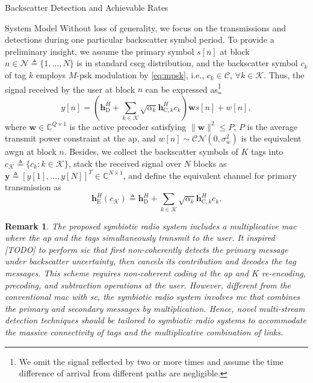 \documentclass[journal]{IEEEtran}
\newtheorem{remark}{Remark}
\begin{document}
\begin{section}{Backscatter Detection and Achievable Rates}
\begin{subsection}{System Model}
			Without loss of generality, we focus on the transmissions and detections during one particular backscatter symbol period. To provide a preliminary insight, we assume the primary symbol $s[n]$ at block $n \in \mathcal{N} \triangleq \{1,\ldots,N\}$ is in standard \gls{cscg} distribution, and the backscatter symbol $c_k$ of tag $k$ employs $M$-\gls{psk} modulation by \eqref{eq:mpsk}, i.e., $c_k \in \mathcal{C}$, $\forall k \in \mathcal{K}$. Thus, the signal received by the user at block $n$ can be expressed as\footnote{We omit the signal reflected by two or more times\cite{Wu2019} and assume the time difference of arrival from different paths are negligible\cite{Guo2019b}.}
			\begin{equation}
				y[n] = \left(\boldsymbol{h}_{\mathrm{D}}^H + \sum_{k \in \mathcal{K}} \sqrt{\alpha_k} \boldsymbol{h}_{\mathrm{C},k}^H c_k\right) \boldsymbol{w} s[n] + w[n],
				\label{eq:received_signal}
			\end{equation}
			where $\boldsymbol{w} \in \mathbb{C}^{Q \times 1}$ is the active precoder satisfying $\lVert \boldsymbol{w} \rVert^2 \le P$, $P$ is the average transmit power constraint at the \gls{ap}, and $w[n] \sim \mathcal{CN}(0,\sigma_w^2)$ is the equivalent \gls{awgn} at block $n$. Besides, we collect the backscatter symbols of $K$ tags into $c_{\mathcal{K}} \triangleq \{c_k : k \in \mathcal{K}\}$, stack the received signal over $N$ blocks as $\boldsymbol{y} \triangleq \left[y[1],\ldots,y[N]\right]^T \in \mathbb{C}^{N \times 1}$, and define the equivalent channel for primary transmission as
			\begin{equation}
				\boldsymbol{h}_{\mathrm{E}}^H(c_{\mathcal{K}}) \triangleq \boldsymbol{h}_{\mathrm{D}}^H + \sum_{k \in \mathcal{K}} \sqrt{\alpha_k} \boldsymbol{h}_{\mathrm{C},k}^H c_k.
				\label{eq:equivalent_primary_channel}
			\end{equation}

			\begin{remark}
				The proposed symbiotic radio system includes a multiplicative \gls{mac} where the \gls{ap} and the tags simultaneously transmit to the user. It inspired [TODO] to perform \gls{sic} that first non-coherently detects the primary message under backscatter uncertainty, then cancels its contribution and decodes the tag messages. This scheme requires non-coherent coding at the \gls{ap} and $K$ re-encoding, precoding, and subtraction operations at the user. However, different from the conventional \gls{mac} with \gls{sc}, the symbiotic radio system involves \gls{mc} that combines the primary and secondary messages by multiplication. Hence, novel multi-stream detection techniques should be tailored to symbiotic radio systems to accommodate the massive connectivity of tags and the multiplicative combination of links.
			\end{remark}
		\end{subsection}


\end{section}
\end{document}
